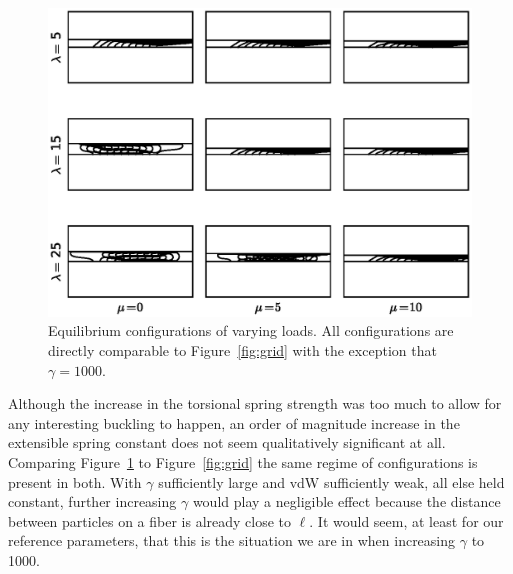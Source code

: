 	\begin{figure}
		\begin{center}
			\includegraphics[scale=1]{./fig/ch4/grid_g1000.eps}
		\end{center}		
		\caption{Equilibrium configurations of varying loads. All configurations are directly comparable to Figure~\ref{fig:grid} with the exception that $\gamma = 1000$.
		\label{fig:grid_g1000}}
	\end{figure}
	
	Although the increase in the torsional spring strength was too much to allow for any interesting buckling to happen, an order of magnitude increase in the extensible spring constant does not seem qualitatively significant at all. Comparing Figure~\ref{fig:grid_g1000} to Figure~\ref{fig:grid} the same regime of configurations is present in both. With $\gamma$ sufficiently large and vdW sufficiently weak, all else held constant, further increasing $\gamma$ would play  a negligible effect because the distance between particles on a fiber is already close to $\ell$. It would seem, at least for our reference parameters, that this is the situation we are in when increasing $\gamma$ to 1000.
	
